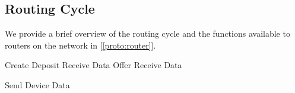 \documentclass[10pt, nonatbib, nocopyrightspace, reprint]{sigplanconf}
\newenvironment{protocol}[2]{
  \begin{algorithm}[!htb]
    \DontPrintSemicolon
    \caption{#1}\label{#2}
}{
  \end{algorithm}
  \FloatBarrier
}
\newcommand{\protoref}[1]{[\autoref{#1}]}
\begin{document}
\subsection{Routing Cycle}\label{cycle:router}

We provide a brief overview of the routing cycle and the functions available to routers on the network in \protoref{proto:router}.

\begin{protocol}{Router Protocol Overview}{proto:router}

   {
    Create Deposit
    Receive Data Offer \;
    Receive Data \;
  }

   {
    Send Device Data \;
  }
\end{protocol}
\end{document}
